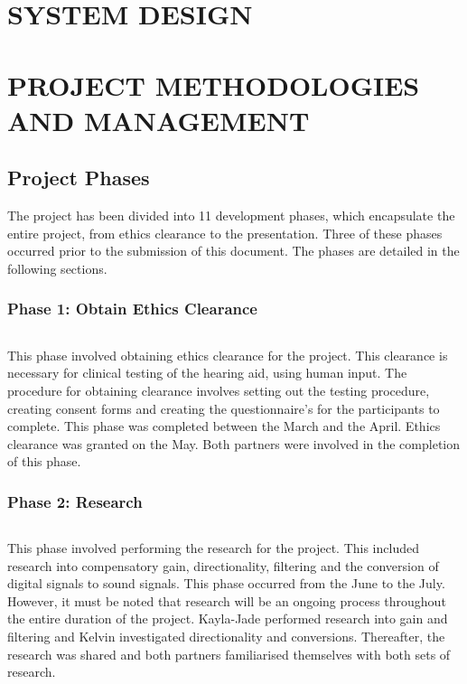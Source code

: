 \documentclass[10pt,twocolumn]{witseiepaper}
\begin{document}
\section{SYSTEM DESIGN}

\section{PROJECT METHODOLOGIES AND MANAGEMENT}
\subsection{Project Phases}
The project has been divided into 11 development phases, which encapsulate the entire project, from ethics clearance to the presentation. Three of these phases occurred prior to the submission of this document. The phases are detailed in the following sections.

\subsubsection*{Phase 1: Obtain Ethics Clearance} $    $

This phase involved obtaining ethics clearance for the project. This clearance is necessary for clinical testing of the hearing aid, using human input. The procedure for obtaining clearance involves setting out the testing procedure, creating consent forms and creating the questionnaire's for the participants to complete. This phase was completed between the  March and the  April. Ethics clearance was granted on the  May. Both partners were involved in the completion of this phase.

\subsubsection*{Phase 2: Research} $    $

This phase involved performing the research for the project. This included research into compensatory gain, directionality, filtering and the conversion of digital signals to sound signals. This phase occurred from the  June to the  July. However, it must be noted that research will be an ongoing process throughout the entire duration of the project. Kayla-Jade performed research into gain and filtering and Kelvin investigated directionality and conversions. Thereafter, the research was shared and both partners familiarised themselves with both sets of research.
\end{document}
